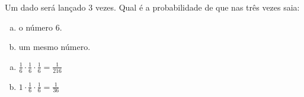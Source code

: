 \begin{ex}
   Um dado será lançado 3 vezes. Qual é a probabilidade de que nas três vezes saia:
   \begin{enumerate}[(a)]
   \item o número 6.
   \item um mesmo número.
   \end{enumerate}
     \begin{sol}
      \phantom{A}
        \begin{enumerate} [(a)]
            \item $\frac{1}{6}\cdot\frac{1}{6}\cdot\frac{1}{6}=\frac{1}{216}$
            \item $1\cdot\frac{1}{6}\cdot\frac{1}{6}=\frac{1}{36}$
        \end{enumerate}
     \end{sol}
\end{ex}